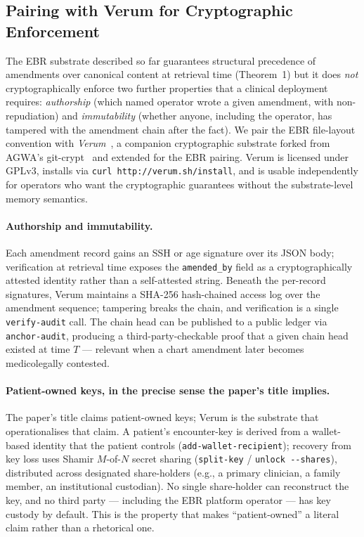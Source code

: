 \documentclass[runningheads]{llncs}
\begin{document}
\subsection{Pairing with Verum for Cryptographic Enforcement}
\label{sec:ebr-verum}

The EBR substrate described so far guarantees structural precedence of
amendments over canonical content at retrieval time (Theorem~1) but it
does \emph{not} cryptographically enforce two further properties that a
clinical deployment requires: \emph{authorship} (which named operator
wrote a given amendment, with non-repudiation) and \emph{immutability}
(whether anyone, including the operator, has tampered with the amendment
chain after the fact). We pair the EBR file-layout convention with
\emph{Verum}~\cite{verum2026}, a companion cryptographic substrate forked
from AGWA's git-crypt~\cite{gitcrypt2021} and extended for the EBR
pairing. Verum is licensed under GPLv3, installs via
\texttt{curl http://verum.sh/install}, and is usable independently for
operators who want the cryptographic guarantees without the
substrate-level memory semantics.

\paragraph{Authorship and immutability.}
Each amendment record gains an SSH or age signature over its JSON body;
verification at retrieval time exposes the \texttt{amended\_by} field as a
cryptographically attested identity rather than a self-attested string.
Beneath the per-record signatures, Verum maintains a SHA-256 hash-chained
access log over the amendment sequence; tampering breaks the chain, and
verification is a single \texttt{verify-audit} call. The chain head can
be published to a public ledger via \texttt{anchor-audit}, producing a
third-party-checkable proof that a given chain head existed at time
$T$ --- relevant when a chart amendment later becomes medicolegally
contested.

\paragraph{Patient-owned keys, in the precise sense the paper's title implies.}
The paper's title claims patient-owned keys; Verum is the substrate that
operationalises that claim. A patient's encounter-key is derived from a
wallet-based identity that the patient controls
(\texttt{add-wallet-recipient}); recovery from key loss uses Shamir
$M$-of-$N$ secret sharing (\texttt{split-key} / \texttt{unlock -{}-shares}),
distributed across designated share-holders (e.g., a primary clinician,
a family member, an institutional custodian). No single share-holder can
reconstruct the key, and no third party --- including the EBR platform
operator --- has key custody by default. This is the property that makes
``patient-owned'' a literal claim rather than a rhetorical one.
\end{document}
